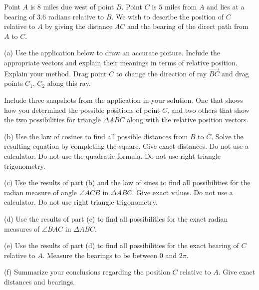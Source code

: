 \documentclass{ximera}
\begin{document}
\begin{question}  \label{Qdf45g5t653}
Point $A$ is $8$ miles due west of point $B$. Point $C$ is $5$ miles from $A$ and lies at a bearing of $3.6$ radians relative to $B$. We wish to describe the position of $C$ relative to $A$ by giving the distance $AC$ and the bearing of the direct path from $A$ to $C$.

(a) Use the application below to draw an accurate picture. Include the appropriate vectors and explain their meanings in terms of relative position. Explain your method. Drag point $C$ to change the direction of ray $\overrightarrow{BC}$ and drag points $C_1$, $C_2$ along this ray.

Include three snapshots from the application in your solution. One that shows how you determined the possible positions of point $C$, and two others that show the two possibilities for triangle $\Delta ABC$ along with the relative position vectors. 

(b) Use the law of cosines to find all possible distances from $B$ to $C$. Solve the resulting equation by completing the square. Give exact distances. Do not use a calculator. Do not use the quadratic formula. Do not use right triangle trigonometry. 

(c) Use the results of part (b) and the law of sines to find all possibilities for the radian measure of angle $\angle ACB$ in $\Delta ABC$. Give exact values. Do not use a calculator. Do not use right triangle trigonometry.

(d) Use the results of part (c) to find all possibilities for the exact radian measures of $\angle BAC$ in $\Delta ABC$. 

(e) Use the results of part (d) to find all possibilities for the exact bearing of $C$ relative to $A$. Measure the bearings to be between $0$ and $2\pi$.


(f) Summarize your conclusions regarding the position $C$ relative to $A$. Give exact distances and bearings. %

 
\begin{onlineOnly}
    \begin{center}
\end{center}
\end{onlineOnly}
\end{question}
\end{document}

